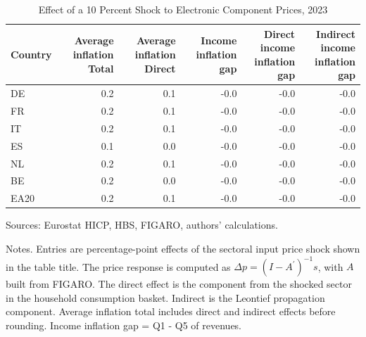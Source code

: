\documentclass[11pt]{article}
\begin{document}
\begin{table}[H]
\centering
\caption{Effect of a 10 Percent Shock to Electronic Component Prices, 2023}
\scriptsize
\setlength{\tabcolsep}{4.2pt}
\begin{tabular}{lrrrrr}
\toprule
Country & \shortstack{Average inflation\\Total} & \shortstack{Average inflation\\Direct} & \shortstack{Income inflation\\gap} & \shortstack{Direct income\\inflation gap} & \shortstack{Indirect income\\inflation gap}
 \\
\midrule
DE & 0.2 & 0.1 & -0.0 & -0.0 & -0.0
 \\
FR & 0.2 & 0.1 & -0.0 & -0.0 & -0.0
 \\
IT & 0.2 & 0.1 & -0.0 & -0.0 & -0.0
 \\
ES & 0.1 & 0.0 & -0.0 & -0.0 & -0.0
 \\
NL & 0.2 & 0.1 & -0.0 & -0.0 & -0.0
 \\
BE & 0.2 & 0.0 & -0.0 & -0.0 & -0.0
 \\
EA20 & 0.2 & 0.1 & -0.0 & -0.0 & -0.0
 \\
\bottomrule
\end{tabular}
\par\vspace{0.35em}\footnotesize\noindent Sources: Eurostat HICP, HBS, FIGARO, authors' calculations.
\par\vspace{0.25em}\footnotesize\noindent Notes. Entries are percentage-point effects of the sectoral input price shock shown in the table title. The price response is computed as $\Delta p = (I - A^{\prime})^{-1}s$, with $A$ built from FIGARO. The direct effect is the component from the shocked sector in the household consumption basket. Indirect is the Leontief propagation component. Average inflation total includes direct and indirect effects before rounding. Income inflation gap = Q1 - Q5 of revenues.
\end{table}
\vspace{0.6em}
\end{document}
